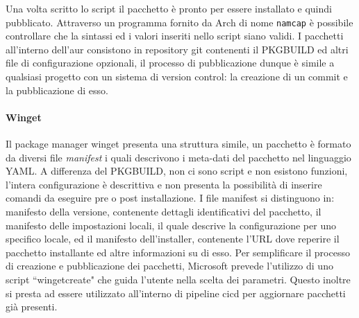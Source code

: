 Una volta scritto lo script il pacchetto è pronto per essere installato e quindi pubblicato. Attraverso un programma fornito da Arch di nome \texttt{namcap} è possibile controllare che la sintassi ed i valori inseriti nello script siano validi. I pacchetti all'interno dell'\ac{aur} consistono in repository git contenenti il PKGBUILD ed altri file di configurazione opzionali, il processo di pubblicazione dunque è simile a qualsiasi progetto con un sistema di version control: la creazione di un commit e la pubblicazione di esso.

\paragraph{Winget}\label{chap:winget} Il package manager winget presenta una struttura simile, un pacchetto è formato da diversi file \textit{manifest} i quali descrivono i meta-dati del pacchetto nel linguaggio YAML. A differenza del PKGBUILD, non ci sono script e non esistono funzioni, l'intera configurazione è descrittiva e non presenta la possibilità di inserire comandi da eseguire pre o post installazione. I file manifest si distinguono in: manifesto della versione, contenente dettagli identificativi del pacchetto, il manifesto delle impostazioni locali, il quale descrive la configurazione per uno specifico locale, ed il manifesto dell'installer, contenente l'URL dove reperire il pacchetto installante ed altre informazioni su di esso. Per semplificare il processo di creazione e pubblicazione dei pacchetti, Microsoft prevede l'utilizzo di uno script ``wingetcreate" che guida l'utente nella scelta dei parametri. Questo inoltre si presta ad essere utilizzato all'interno di pipeline \ac{cicd} per aggiornare pacchetti già presenti.

